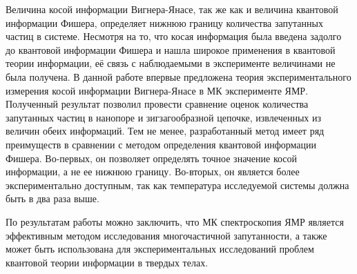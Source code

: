 Величина косой информации Вигнера-Янасе,
так же как и величина квантовой информации Фишера,
определяет нижнюю границу количества запутанных частиц в системе.
Несмотря на то, что косая информация была введена задолго до квантовой информации Фишера
и нашла широкое применения в квантовой теории информации,
её связь с наблюдаемыми в эксперименте величинами не была получена.
В данной работе впервые предложена теория экспериментального измерения косой информации Вигнера-Янасе
в МК эксперименте ЯМР.
Полученный результат позволил провести сравнение оценок количества запутанных частиц в нанопоре и зигзагообразной цепочке,
извлеченных из величин обеих информаций.
Тем не менее, разработанный метод имеет ряд преимуществ в сравнении с методом определения квантовой информации Фишера.
Во-первых, он позволяет определять точное значение косой информации, а не ее нижнюю границу.
Во-вторых, он является более экспериментально доступным, так как температура исследуемой системы должна быть в два раза выше.


По результатам работы можно заключить,
что МК спектроскопия ЯМР является эффективным методом исследования многочастичной запутанности,
а также может быть использована для экспериментальных исследований проблем квантовой теории информации в твердых телах.

